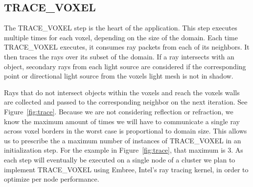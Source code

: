 \subsection{TRACE\_VOXEL}

The TRACE\_VOXEL step is the heart of the application. This step
executes multiple times for each voxel, depending on the size of the
domain. Each time TRACE\_VOXEL executes, it consumes ray packets from
each of its neighbors. It then traces the rays over its subset of the
domain. If a ray intersects with an object, secondary rays from each
light source are considered if the corresponding point or directional
light source from the voxels light mesh is not in shadow.

Rays that do not intersect objects within the voxels and reach the
voxels walls are collected and passed to the corresponding neighbor on
the next iteration. See Figure~\ref{fig:trace}. Because we are not
considering reflection or refraction, we know the maximum amount of
times we will have to communicate a single ray across voxel borders in
the worst case is proportional to domain size. This allows us to
prescribe the a maximum number of instances of TRACE\_VOXEL in an
initialization step. For the example in Figure~\ref{fig:trace}, that
maximum is 3. As each step will eventually be executed on a single
node of a cluster we plan to implement TRACE\_VOXEL using Embree,
Intel’s ray tracing kernel, in order to optimize per node performance.

